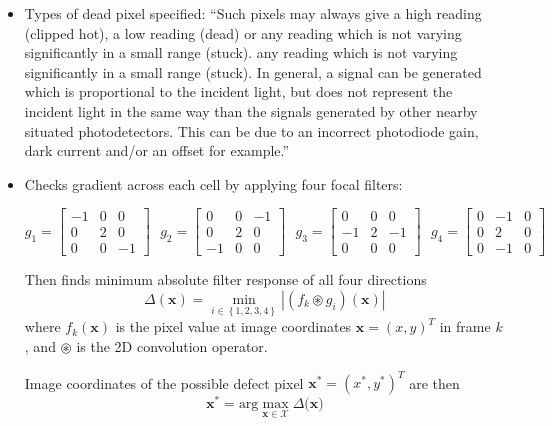 \documentclass[10pt,fleqn]{article}
\begin{document}
\begin{itemize}

\item Types of dead pixel specified: ``Such pixels may always give a high reading (clipped hot), a low reading (dead) or
any reading which is not varying significantly in a small range (stuck). any reading which is not varying significantly in a small range (stuck). In general, a signal can be generated which is proportional to the incident light, but does not represent the incident light in the same way than the signals generated by other nearby situated photodetectors. This can be due to an incorrect photodiode gain, dark current and/or an offset for example.''

\item Checks gradient across each cell by applying four focal filters:

\begin{center}
$
g_1 = \left[ \begin{matrix} -1 & 0 & 0 \\ 0 & 2 & 0 \\ 0 & 0 & -1 \end{matrix} \right]
\, \, \, \,  
g_2 = \left[ \begin{matrix} 0 & 0 & -1 \\ 0 & 2 & 0 \\ -1 & 0 & 0 \end{matrix} \right]
\, \, \, \, 
g_3 = \left[ \begin{matrix} 0 & 0 & 0 \\ -1 & 2 & -1 \\ 0 & 0 & 0 \end{matrix} \right]
\, \, \, \, 
g_4 = \left[ \begin{matrix} 0 & -1 & 0 \\ 0 & 2 & 0 \\ 0 & -1 & 0 \end{matrix} \right] $
\end{center}

Then finds minimum absolute filter response of all four directions
\[ \Delta (\textbf{x}) = \min_{i \in \left\lbrace 1, 2, 3, 4 \right\rbrace} |(f_k \circledast g_i)(\textbf{x})| \]
where $f_k(\textbf{x})$ is the pixel value at image coordinates $\textbf{x} = (x, y)^T$ in frame $k$, and $\circledast$ is the 2D convolution operator.

Image coordinates of the possible defect pixel $\textbf{x}^* = (x^*, y^*)^T$ are then
\[ \textbf{x}^* = \text{arg}\max_{\textbf{x} \in \mathcal{X}} \Delta(\textbf{x)} \]


\end{itemize}
\end{document}
